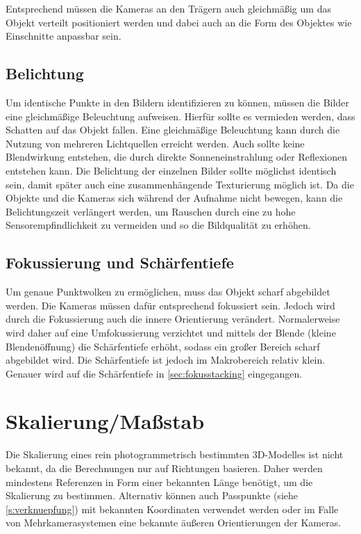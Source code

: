 \documentclass[./00PhotoBox.tex]{subfiles}
\begin{document}
Entsprechend müssen die Kameras an den Trägern auch gleichmäßig um das Objekt verteilt positioniert werden und dabei auch an die Form des Objektes wie Einschnitte anpassbar sein.

\subsection{Belichtung}
Um identische Punkte in den Bildern identifizieren zu können, müssen die Bilder eine gleichmäßige Beleuchtung aufweisen. Hierfür sollte es vermieden werden, dass Schatten auf das Objekt fallen. Eine gleichmäßige Beleuchtung kann durch die Nutzung von mehreren Lichtquellen erreicht werden. Auch sollte keine Blendwirkung entstehen, die durch direkte Sonneneinstrahlung oder Reflexionen entstehen kann. Die Belichtung der einzelnen Bilder sollte möglichst identisch sein, damit später auch eine zusammenhängende Texturierung möglich ist.
Da die Objekte und die Kameras sich während der Aufnahme nicht bewegen, kann die Belichtungszeit verlängert werden, um Rauschen durch eine zu hohe Sensorempfindlichkeit zu vermeiden und so die Bildqualität zu erhöhen.


\subsection{Fokussierung und Schärfentiefe}
Um genaue Punktwolken zu ermöglichen, muss das Objekt scharf abgebildet werden. Die Kameras müssen dafür entsprechend fokussiert sein. Jedoch wird durch die Fokussierung auch die innere Orientierung verändert. Normalerweise wird daher auf eine Umfokussierung verzichtet und mittels der Blende (kleine Blendenöffnung) die Schärfentiefe erhöht, sodass ein großer Bereich scharf abgebildet wird. Die Schärfentiefe ist jedoch im Makrobereich relativ klein. Genauer wird auf die Schärfentiefe in \autoref{sec:fokusstacking} eingegangen.

\section{Skalierung/Maßstab}
\label{sec:massstab}
Die Skalierung eines rein photogrammetrisch bestimmten 3D-Modelles ist nicht bekannt, da die Berechnungen nur auf Richtungen basieren. Daher werden mindestens Referenzen in Form einer bekannten Länge benötigt, um die Skalierung zu bestimmen. Alternativ können auch Passpunkte (siehe \autoref{s:verknuepfung}) mit bekannten Koordinaten verwendet werden oder im Falle von Mehrkamerasystemen eine bekannte äußeren Orientierungen der Kameras. \citep[S. 546]{luhmann}
\end{document}
